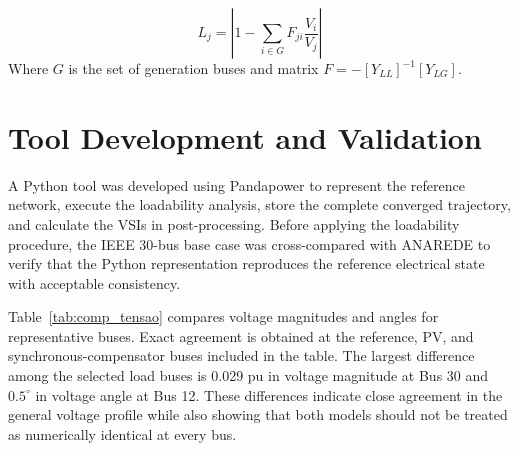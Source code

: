 \documentclass[conference]{IEEEtran}
\begin{document}
\begin{equation}
L_j = \left| 1 - \sum_{i \in G} F_{ji} \frac{V_i}{V_j} \right|
\end{equation}
Where $G$ is the set of generation buses and matrix $F = -[Y_{LL}]^{-1}[Y_{LG}]$.

\section{Tool Development and Validation}
\label{sec:tool}

A Python tool was developed using Pandapower to represent the reference network, execute the loadability analysis, store the complete converged trajectory, and calculate the VSIs in post-processing. Before applying the loadability procedure, the IEEE 30-bus base case was cross-compared with ANAREDE to verify that the Python representation reproduces the reference electrical state with acceptable consistency.

Table~\ref{tab:comp_tensao} compares voltage magnitudes and angles for representative buses. Exact agreement is obtained at the reference, PV, and synchronous-compensator buses included in the table. The largest difference among the selected load buses is 0.029 pu in voltage magnitude at Bus 30 and $0.5^\circ$ in voltage angle at Bus 12. These differences indicate close agreement in the general voltage profile while also showing that both models should not be treated as numerically identical at every bus.

\begin{table}[!t]
\centering
\caption{Voltage and Angle Comparison: Python vs. ANAREDE}
\label{tab:comp_tensao}
\end{table}
\end{document}
